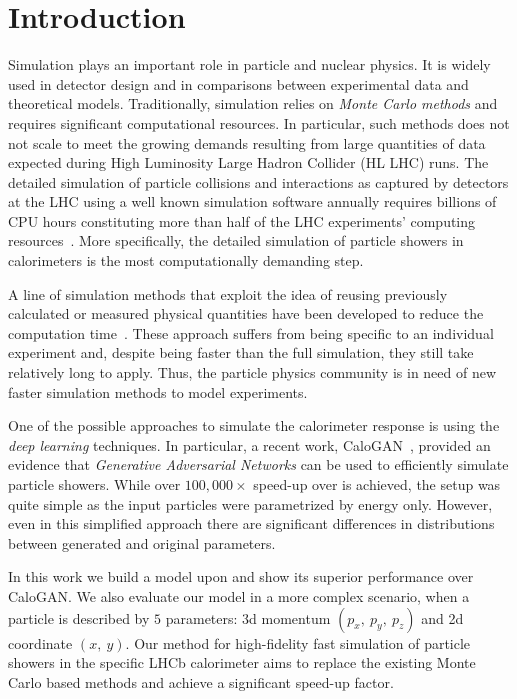 \section{Introduction}

Simulation plays an important role in particle and nuclear physics. It is widely used in detector design and in comparisons between experimental data and theoretical models. Traditionally, simulation relies on \textit{Monte Carlo methods} and requires significant computational resources. In particular, such methods does not not scale to meet the growing demands resulting from large quantities of data expected during High Luminosity Large Hadron Collider (HL LHC) runs. The detailed simulation of particle collisions and interactions as captured by detectors at the LHC using a well known simulation software \geant annually requires billions of CPU hours constituting more than half of the LHC experiments' computing resources~\cite{bozzi2014,flynn2015computing}. More specifically, the detailed simulation of particle showers in calorimeters is the most computationally demanding step.
 
A line of simulation methods that exploit the idea of reusing previously calculated or measured physical quantities have been developed to reduce the computation time~\cite{grindhammer2000parameterized,atlas2010simulation}. These approach suffers from being specific to an individual experiment and, despite being faster than the full simulation, they still take relatively long to apply. Thus, the particle physics community is in need of new faster simulation methods to model experiments. 
    
One of the possible approaches to simulate the calorimeter response is using the \textit{deep learning} techniques. In particular, a recent work, CaloGAN~\cite{paganini2017calogan}, provided an evidence that \textit{Generative Adversarial Networks} can be used to efficiently simulate particle showers. While over $100,000 \times$ speed-up over \geant is achieved, the setup was quite simple as the input particles were parametrized by energy only. However,  even in this simplified approach there are significant differences in distributions between generated and original parameters. 

In this work we build a model upon  and show its superior performance over CaloGAN. We also evaluate our model in a more complex scenario, when a particle is described by $5$ parameters: 3d momentum $(p_x,~ p_y,~ p_z)$ and 2d coordinate $(x,~ y)$. Our method for high-fidelity fast simulation of particle showers in the specific LHCb calorimeter aims to replace the existing Monte Carlo based methods and achieve a significant speed-up factor.
 



